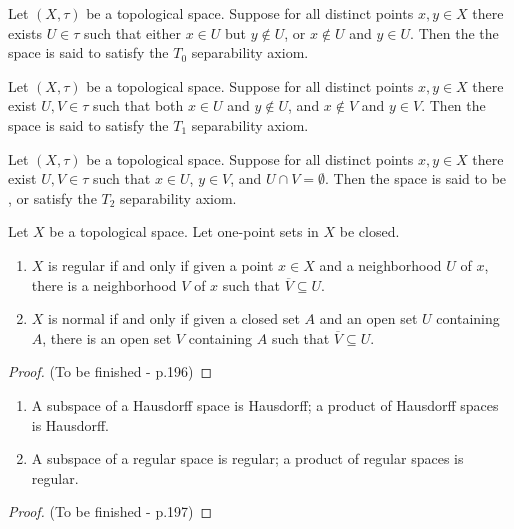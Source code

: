 \documentclass[12pt, a4paper, oneside, openright, titlepage]{book}
\begin{document}
\begin{defn}
    Let $(X,\tau)$ be a topological space. Suppose for all distinct points $x,y \in X$ there exists $U \in \tau$ such that either $x \in U$ but $y \notin U$, or $x \notin U$ and $y \in U$. Then the the space is said to satisfy the $T_0$ separability axiom.
\end{defn}


\begin{defn}
    Let $(X,\tau)$ be a topological space. Suppose for all distinct points $x,y \in X$ there exist $U,V \in \tau$ such that both $x \in U$ and $y \notin U$, and $x \notin V$ and $y \in V$. Then the space is said to satisfy the $T_1$ separability axiom.
\end{defn}


\begin{defn}
    Let $(X,\tau)$ be a topological space. Suppose for all distinct points $x,y \in X$ there exist $U,V \in \tau$ such that $x \in U$, $y \in V$, and $U\cap V = \emptyset$. Then the space is said to be , or satisfy the $T_2$ separability axiom.
\end{defn}

\begin{lem}
    Let $X$ be a topological space. Let one-point sets in $X$ be closed. \begin{enumerate}
        \item $X$ is regular if and only if given a point $x \in X$ and a neighborhood $U$ of $x$, there is a neighborhood $V$ of $x$ such that $\overline{V} \subseteq U$.
        \item $X$ is normal if and only if given a closed set $A$ and an open set $U$ containing $A$, there is an open set $V$ containing $A$ such that $\overline{V}\subseteq U$.
    \end{enumerate}
\end{lem}
\begin{proof}
    (To be finished - p.196)
\end{proof}

\begin{thm}
    \leavevmode
    \begin{enumerate}
        \item A subspace of a Hausdorff space is Hausdorff; a product of Hausdorff spaces is Hausdorff.
        \item A subspace of a regular space is regular; a product of regular spaces is regular.
    \end{enumerate}
\end{thm}
\begin{proof}
    (To be finished - p.197)
\end{proof}
\end{document}
